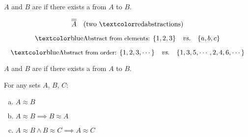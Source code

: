 
\begin{frame}{}
\end{frame}

\begin{frame}{}
  \begin{definition}[$|A| = |B| \;(A \approx B)$ (1878)]
    $A$ and $B$ are  if there exists a  from $A$ to $B$.
  \end{definition}

  \pause
  \[
    \overline{\overline{A}} \quad \text{(two \red{abstractions})}
  \]

  \pause
  \[
    \text{\blue{\small Abstract from elements: }} \set{1,2,3} \quad \text{\it vs.} \quad \set{a,b,c}
  \]

  \pause
  \[
    \text{\blue{\small Abstract from order: }} \set{1,2,3,\cdots} \quad \text{\it vs.} \quad \set{1,3,5,\cdots, 2,4,6,\cdots}
  \]
\end{frame}

\begin{frame}{}
  \begin{definition}[$|A| = |B| \;(A \approx B)$ (1878)]
    $A$ and $B$ are  if there exists a  from $A$ to $B$.
  \end{definition}

  \vspace{0.30cm}
  \begin{center}
  \end{center}

  \pause
  \begin{theorem}
    For any sets $A$, $B$, $C$:
    \begin{enumerate}[(a)]
      \item $A \approx B$
      \item $A \approx B \implies B \approx A$
      \item $A \approx B \land B \approx C \implies A \approx C$
    \end{enumerate}
  \end{theorem}
\end{frame}

